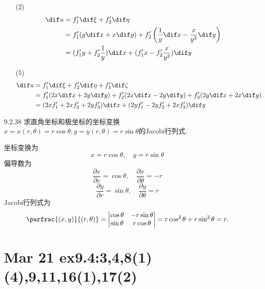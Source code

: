 \begin{solution}
    \begin{enumerate}
        \item[(2)] \begin{align*}
            \dif u &= f_1' \dif \xi + f_2' \dif \eta\\
            &= f_1' (y \dif x + x \dif y) + f_2' \left( \frac{1}{y} \dif x - \frac{x}{y^2} \dif y \right)\\
            &= (f_1' y + f_2' \frac{1}{y}) \dif x + (f_1' x - f_2' \frac{x}{y^2}) \dif y
        \end{align*}
        \item[(5)] \begin{align*}
            \dif u &= f_1' \dif \xi + f_2' \dif \eta + f_3' \dif \zeta\\
            &= f_1' (2x \dif x + 2y \dif y) + f_2' (2x \dif x - 2y \dif y) + f_3' (2y \dif x + 2x \dif y)\\
            &= (2xf_1' + 2xf_2' + 2yf_3') \dif x + (2yf_1' - 2yf_2' + 2xf_3') \dif y
        \end{align*}
    \end{enumerate}
\end{solution}

\begin{exercise}{9.2.38}
求直角坐标和极坐标的坐标变换$x = x(r,\theta) = r \cos \theta, y = y(r,\theta) = r \sin \theta$的Jacobi行列式.
\end{exercise}

\begin{solution}
    坐标变换为
    $$x = r \cos \theta, \quad y = r \sin \theta$$
    偏导数为
    $$\frac{\partial x}{\partial r} = \cos \theta, \quad \frac{\partial x}{\partial \theta} = -r $$
    $$\frac{\partial y}{\partial r} = \sin \theta, \quad \frac{\partial y}{\partial \theta} = r $$
    Jacobi行列式为
    $$\parfrac{(x,y)}{(r,\theta)} = \begin{vmatrix}
        \cos \theta & -r \sin \theta\\
        \sin \theta & r \cos \theta
    \end{vmatrix} = r \cos^2 \theta + r \sin^2 \theta = r.$$
\end{solution}





\section{Mar 21 ex9.4:3,4,8(1)(4),9,11,16(1),17(2)}

